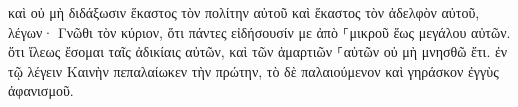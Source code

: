\documentclass{openreader}
\begin{document}
καὶ οὐ μὴ διδάξωσιν ἕκαστος τὸν πολίτην αὐτοῦ καὶ ἕκαστος τὸν ἀδελφὸν αὐτοῦ, λέγων· Γνῶθι τὸν κύριον, ὅτι πάντες εἰδήσουσίν με ἀπὸ ⸀μικροῦ ἕως μεγάλου αὐτῶν. 
ὅτι ἵλεως ἔσομαι ταῖς ἀδικίαις αὐτῶν, καὶ τῶν ἁμαρτιῶν ⸀αὐτῶν οὐ μὴ μνησθῶ ἔτι. 
ἐν τῷ λέγειν Καινὴν πεπαλαίωκεν τὴν πρώτην, τὸ δὲ παλαιούμενον καὶ γηράσκον ἐγγὺς ἀφανισμοῦ. 
\end{document}
